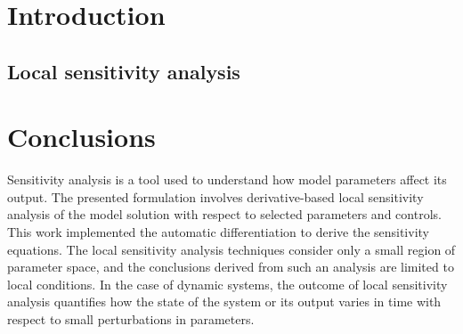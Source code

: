 \documentclass[a4paper,fleqn]{cas-dc}
\begin{document}
\maketitle


\section{Introduction}








\subsection{Local sensitivity analysis} \label{CH: Sensitivity_Analysis}





\section{Conclusions} \label{CH: Conclusion}

Sensitivity analysis is a tool used to understand how model parameters affect its output. The presented formulation involves derivative-based local sensitivity analysis of the model solution with respect to selected parameters and controls. This work implemented the automatic differentiation to derive the sensitivity equations. The local sensitivity analysis techniques consider only a small region of parameter space, and the conclusions derived from such an analysis are limited to local conditions. In the case of dynamic systems, the outcome of local sensitivity analysis quantifies how the state of the system or its output varies in time with respect to small perturbations in parameters.
\end{document}
